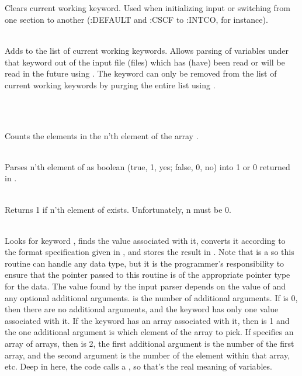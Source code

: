 \begin{center} \\ \end{center}

 \\
Clears current working keyword.  Used when initializing input or switching
from one section to another (:DEFAULT and :CSCF to :INTCO, for instance).

 \\
Adds  to the list of current working keywords.  Allows parsing of 
variables under that keyword out of the input file (files) which has
(have) been read or will be read in the future using .
The keyword  can only be removed from the list of current working
keywords by purging the entire list using . 

\begin{center}  \\ \end{center}

 \\
Counts the elements in the n'th element of the array .

 \\
Parses n'th element of  as boolean (true, 1, yes; false, 0, no)
into 1 or 0 returned in .

 \\
Returns 1 if n'th element of  exists.  Unfortunately, n must be 0.

 \\
Looks for keyword , finds the value associated with it,
converts it according to the format specification given in
, and stores the result in .  Note that
 is a  so this routine can handle any data
type, but it is the programmer's responsibility to ensure that the
pointer passed to this routine is of the appropriate pointer type for
the data.  The value found by the input parser depends on the value of
 and any optional additional arguments.   is the
number of additional arguments.  If  is 0, then there are no
additional arguments, and the keyword has only one value associated
with it.  If the keyword has an array associated with it, then
 is 1 and the one additional argument is which element of the
array to pick.  If  specifies an array of arrays, then
 is 2, the first additional argument is the number of the
first array, and the second argument is the number of the element
within that array, etc.  Deep in here, the code calls a
, so that's the real meaning of
variables.

